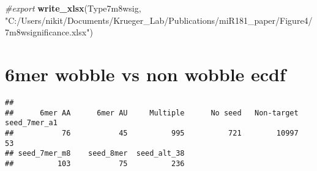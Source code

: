 \documentclass[
]{article}
\newenvironment{Shaded}{\begin{snugshade}}{\end{snugshade}}
\newcommand{\CommentTok}[1]{\textcolor[rgb]{0.56,0.35,0.01}{\textit{#1}}}
\newcommand{\FunctionTok}[1]{\textcolor[rgb]{0.13,0.29,0.53}{\textbf{#1}}}
\newcommand{\NormalTok}[1]{#1}
\newcommand{\OtherTok}[1]{\textcolor[rgb]{0.56,0.35,0.01}{#1}}
\newcommand{\SpecialCharTok}[1]{\textcolor[rgb]{0.81,0.36,0.00}{\textbf{#1}}}
\newcommand{\StringTok}[1]{\textcolor[rgb]{0.31,0.60,0.02}{#1}}
\begin{document}
\begin{Shaded}
\begin{Highlighting}[]
\CommentTok{\#export}
\FunctionTok{write\_xlsx}\NormalTok{(Type7m8wsig, }\StringTok{"C:/Users/nikit/Documents/Krueger\_Lab/Publications/miR181\_paper/Figure4/7m8wsignificance.xlsx"}\NormalTok{)}
\end{Highlighting}
\end{Shaded}

\hypertarget{mer-wobble-vs-non-wobble-ecdf-1}{%
\section{6mer wobble vs non wobble
ecdf}\label{mer-wobble-vs-non-wobble-ecdf-1}}

\begin{Shaded}
\end{Shaded}

\begin{verbatim}
## 
##      6mer AA      6mer AU     Multiple      No seed   Non-target seed_7mer_a1 
##           76           45          995          721        10997           53 
## seed_7mer_m8    seed_8mer  seed_alt_38 
##          103           75          236
\end{verbatim}
\end{document}
